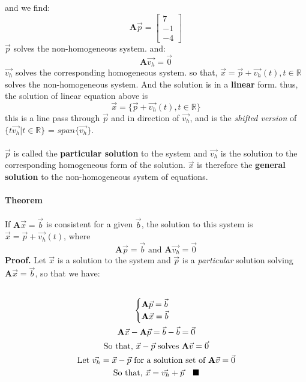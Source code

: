 \documentclass{article}
\begin{document}
	and we find:
	\[
	\textbf{A}\vec{p} = \begin{bmatrix}7\\-1\\-4\end{bmatrix}
	\]
	$\vec{p}$ solves the non-homogeneous system.
	and:
	\[
	\textbf{A}\vec{v_h} = \vec{0}
	\]
	$\vec{v_h}$ solves the corresponding homogeneous system.
	so that, $\vec{x} = \vec{p} + \vec{v_h}(t),t\in\mathbb{R}$ solves the non-homogeneous system. And the solution is in a \textbf{linear} form.
	thus, the solution of linear equation above is
	\[
	\vec{x} = \{ \vec{p} + \vec{v_h}(t) , t \in \mathbb{R} \}
	\]
	this is a line pass through $\vec{p}$ and in direction of $\vec{v_h}$, and is the \emph{shifted version} of $\{t \vec{v_h} \vert t \in \mathbb{R} \}$ = $span\{\vec{v_h}\}$.
	\paragraph{} $\vec{p}$ is called the \textbf{particular solution} to the system and $\vec{v_h}$ is the solution to the corresponding homogeneous form of the solution. $\vec{x}$ is therefore the \textbf{general solution} to the non-homogeneous system of equations. 
	\paragraph{Theorem} If $\textbf{A}\vec{x}=\vec{b}$ is consistent for a given $\vec{b}$, the solution to this system is $\vec{x} = \vec{p} + \vec{v_h}(t)$, where 
	\[
	\textbf{A}\vec{p} = \vec{b} \text{ and } \textbf{A}\vec{v_h} = \vec{0}
	\]
	\newline \textbf{Proof.}
	\newline Let $\vec{x}$ is a solution to the system and $\vec{p}$ is a \emph{particular} solution solving $\textbf{A}\vec{x}=\vec{b}$, so that we have:
	\begin{multline}
	\\ 
	\begin{cases}
		\textbf{A}\vec{p} = \vec{b}\\
		\textbf{A}\vec{x} = \vec{b} \\
	\end{cases} \\
	\textbf{A}\vec{x} - \textbf{A}\vec{p} = \vec{b} - \vec{b} = \vec{0} \\
	\text{So that, } \vec{x} - \vec{p} \text{ solves } \textbf{A}\vec{v} = \vec{0} \\
	\text{Let }\vec{v_h} = \vec{x} - \vec{p}\text{ for a solution set of } \textbf{A}\vec{v} = \vec{0} \\
	\text{So that, }\vec{x} = \vec{v_h} + \vec{p} \text{\quad}\blacksquare\\
	\\
	\end{multline}
\end{document}

